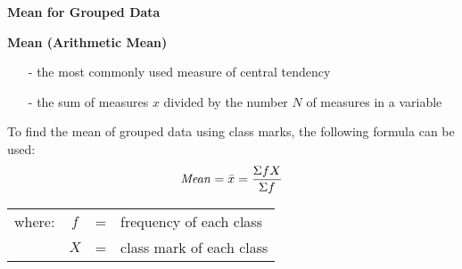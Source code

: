 \begin{center}
\textbf{Mean for Grouped Data
}
\end{center}

\vspace*{1ex}

\textbf{Mean (Arithmetic Mean)}
\begin{itemize} 
\item[-] the most commonly used measure of central tendency

\item[-] the sum of measures $x$ divided by the number $N$ of measures in a variable
\end{itemize}  


To find the mean of grouped data using class marks, the following formula can be used:
\[
\text{\textit{Mean}}=\bar{x}=\displaystyle \frac{\Sigma{fX}}{\Sigma f} 
\] 

\begin{center}
\begin{tabular}{lcll}
where: & $f$ & = &  frequency of each class \\
 & $X $& = &  class mark of each class \\
\end{tabular} 
\end{center} 
 